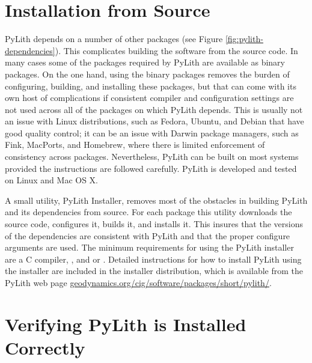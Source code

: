 \section{Installation from Source}

PyLith depends on a number of other packages (see Figure
\vref{fig:pylith-dependencies}).  This complicates building the
software from the source code. In many cases some of the packages
required by PyLith are available as binary packages. On the one hand,
using the binary packages removes the burden of configuring, building,
and installing these packages, but that can come with its own host of
complications if consistent compiler and configuration settings are
not used across all of the packages on which PyLith depends. This is
usually not an issue with Linux distributions, such as Fedora, Ubuntu,
and Debian that have good quality control; it can be an issue with
Darwin package managers, such as Fink, MacPorts, and Homebrew, where
there is limited enforcement of consistency across
packages. Nevertheless, PyLith can be built on most systems provided
the instructions are followed carefully. PyLith is developed and
tested on Linux and Mac OS X.

A small utility, PyLith Installer, removes most of the obstacles in
building PyLith and its dependencies from source. For each package
this utility downloads the source code, configures it, builds it, and
installs it. This insures that the versions of the dependencies are
consistent with PyLith and that the proper configure arguments are
used. The minimum requirements for using the PyLith installer are a C
compiler, , and  or .
Detailed instructions for how to install PyLith using the installer
are included in the installer distribution, which is available from
the PyLith web page
\url{geodynamics.org/cig/software/packages/short/pylith/}.


\section{Verifying PyLith is Installed Correctly}

